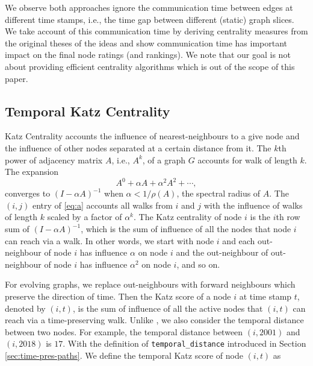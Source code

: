 \documentclass[12pt]{article}
\theoremstyle{definition}
\begin{document}
We observe both approaches ignore the communication time between edges at different time stamps, i.e., the time gap between different (static) graph slices. We take account of this communication time by deriving centrality measures from the original theses of the ideas and show communication time has important impact on the final node ratings (and rankings).
We note that our goal is not about providing efficient centrality algorithms which is out of the scope of this paper.

\subsection{Temporal Katz Centrality}
\label{sec:temp-katz-centr}

Katz Centrality accounts the influence of nearest-neighbours to a give node and the influence of other nodes
separated at a certain distance from it. The $k$th power of adjacency matrix $A$, i.e., $A^k$, of a graph $G$ accounts for walk of length $k$. The expansion
\begin{equation}
  \label{eq:a}
  A^0 + \alpha A + \alpha^2 A^2 + \cdots,
\end{equation}
converges to $(I - \alpha A)^{-1}$ when $\alpha < 1/\rho(A)$, the spectral radius of $A$. The $(i,j)$ entry of \eqref{eq:a}
accounts all walks from $i$ and $j$ with the influence of walks of length $k$ scaled by a factor of $\alpha^k$.
The Katz centrality of node $i$ is the $i$th row sum of $(I - \alpha A)^{-1}$, which is the sum of influence of all the nodes that node $i$ can reach via a walk.
In other words, we start with node $i$ and each out-neighbour of node $i$ has influence $\alpha$ on node $i$ and the out-neighbour of out-neighbour of node $i$ has influence $\alpha^2$ on node $i$, and so on.

For evolving graphs, we replace out-neighbours with forward neighbours which preserve the direction of time.
Then the Katz score of a node $i$ at time stamp $t$, denoted by $(i,t)$, is the sum of influence of all the active nodes that $(i,t)$ can reach via a time-preserving walk.
Unlike \cite{grindrod11}, we also consider the temporal distance between two nodes. For example, the temporal distance between $(i, 2001)$ and $(i, 2018)$ is $17$.
With the definition of \texttt{temporal\_distance} introduced in Section \ref{sec:time-pres-paths}.
We define the temporal Katz score of node $(i, t)$ as
\end{document}
